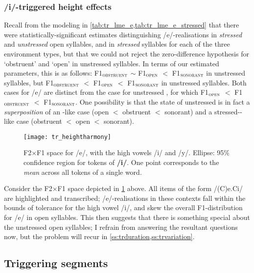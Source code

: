 \subsubsection{/i/-triggered height effects}\label{sss:coarticulation}

Recall from the modeling in \cref{tab:tr_lme_e,tab:tr_lme_e_stressed} that there were statistically-significant estimates distinguishing /e/-realisations in \emph{stressed} and \emph{unstressed} open syllables, and in \emph{stressed} syllables for each of the three environment types, but that we could not reject the zero-difference hypothesis for `obstruent' and `open' in unstressed syllables. In terms of our estimated parameters, this is as follows: F1$_\textsc{obstruent}$ $\sim$ F1$_\textsc{open}$ $<$ F1$_\textsc{sonorant}$ in unstressed syllables, but F1$_\textsc{obstruent}$ $<$ F1$_\textsc{open}$ $<$ F1$_\textsc{sonorant}$ in unstressed syllables. Both cases for /e/ are distinct from the case for unstressed , for which F1$_\textsc{open}$ $<$ F1$_\textsc{obstruent}$ $<$ F1$_\textsc{sonorant}$. One possibility is that the state of unstressed  is in fact a \emph{superposition} of an -like case (open $<$ obstruent $<$ sonorant) and a stressed--like case (obstruent $<$ open $<$ sonorant).

\begin{figure}[H]
  \centering
  \texttt{[image: tr\_heightharmony]}
  \caption[F2$\times$F1 space for /e/ in unstressed open syllables.]{F2$\times$F1 space for /e/, with the high vowels /i/ and /y/. Ellipse: 95\% confidence region for tokens of \textbf{/i/}. One point corresponds to the \emph{mean} across all tokens of a single word.}
  \label{fig:trheightharmony}
\end{figure}

Consider the F2$\times$F1 space depicted in \cref{fig:trheightharmony} above. All items of the form /(C)e.Ci/ are highlighted and transcribed; /e/-realisations in these contexts fall within the bounds of tolerance for the high vowel /i/, and skew the overall F1-distribution for /e/ in open syllables. This then suggests that there is something special about the unstressed open syllables; I refrain from answering the resultant questions now, but the problem will recur in \cref{ss:trduration,ss:trvariation}.

\subsection{Triggering segments}\label{ss:tr_codas}

